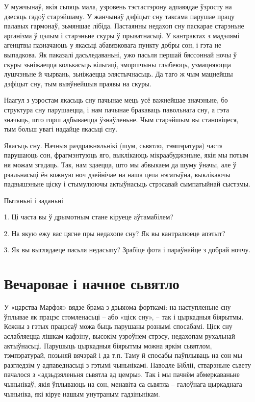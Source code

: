 У мужчынаў, якія сьпяць мала, узровень тэстастэрону адпавядае ўзросту на дзесяць гадоў старэйшаму. У жанчынаў дэфіцыт сну таксама парушае працу палавых гармонаў, зьмяншае лібіда. Пастаянны недахоп сну паскарае старэньне арганізма ў цэлым і старэньне скуры ў прыватнасьці. У кантрактах з мадэлямі агенцтвы пазначаюць у якасьці абавязковага пункту добры сон, і гэта не выпадкова. Як паказалі дасьледаваньні, ужо пасьля першай бяссоннай ночы ў скуры зьніжаецца колькасьць вільгаці, зморшчыны глыбеюць, узмацняюцца лушчэньне й чырвань, зьніжаецца элястычнасьць. Да таго ж чым мацнейшы дэфіцыт сну, тым выяўнейшыя праявы на скуры.

Наагул з узростам якасьць сну пачынае мець усё важнейшае значэньне, бо структура сну парушаецца, і нам пачынае бракаваць павольнага сну, а гэта значыць, што горш адбываецца ўзнаўленьне. Чым старэйшым вы становіцеся, тым больш увагі надайце якасьці сну.

Якасьць сну. Начныя раздражняльнікі (шум, сьвятло, тэмпэратура) часта парушаюць сон, фрагмэнтуюць яго, выклікаюць мікраабуджэньне, якія мы потым ня можам згадаць. Так, нам здаецца, што мы абвыкаем да шуму ўначы, але ў рэальнасьці ён кожную ноч дзейнічае на наша цела нэгатыўна, выклікаючы падвышэньне ціску і стымулюючы актыўнасьць стрэсавай сымпатыйнай сыстэмы.

Пытаньні і заданьні

1. Ці часта вы ў дрымотным стане кіруеце аўтамабілем?

2. На якую ежу вас цягне пры недахопе сну? Як вы кантралюеце апэтыт?

3. Як вы выглядаеце пасьля недасыпу? Зрабіце фота і параўнайце з добрай ноччу.


\section{Вечаровае і начное сьвятло}

У «царства Марфэя» вядзе брама з дзьвюма форткамі: на наступленьне сну ўплывае як працэс стомленасьці – або «ціск сну», – так і цыркадныя біярытмы. Кожны з гэтых працэсаў можа быць парушаны рознымі спосабамі. Ціск сну аслабляецца лішкам кафэіну, высокім узроўнем стрэсу, недахопам рухальнай актыўнасьці. Парушыць цыркадныя біярытмы можна яркім сьвятлом, тэмпэратурай, позьняй вячэрай і да т.п. Таму й спосабы паўплываць на сон мы разгледзім у адпаведнасьці з гэтымі чыньнікамі. Паводле Бібліі, стварэньне сьвету пачалося з «адзьдзяленьня сьвятла ад цемры». Так і мы пачнём абмеркаваньне чыньнікаў, якія ўплываюць на сон, менавіта са сьвятла – галоўнага цыркаднага чыньніка, які кіруе нашым унутраным гадзіньнікам.


